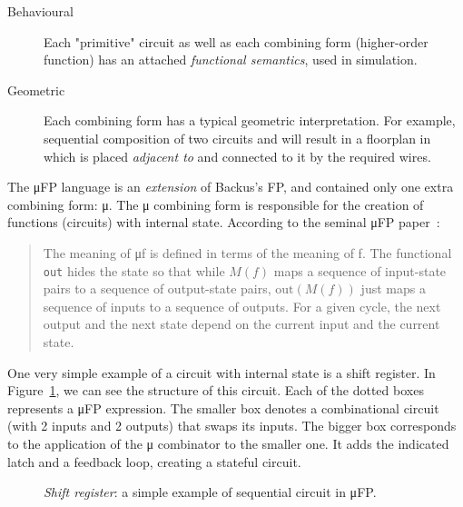         \begin{description}
            \item[Behavioural]
                Each "primitive" circuit as well as each combining form (higher-order function)
                has an attached \emph{functional semantics}, used in simulation.
            \item[Geometric]
                Each combining form has a typical geometric interpretation.
                For example, sequential composition of two circuits  and  will result
                in a floorplan in which  is placed \emph{adjacent to}  and connected to it
                by the required wires.
        \end{description}

        The μFP language is an \emph{extension} of Backus's FP, and contained only one extra combining form: μ.
        The μ combining form is responsible for the creation of functions (circuits) with internal state.
        According to the seminal μFP paper~\cite{mufp-1984}:

        \begin{quote}
            The meaning of μf is defined in terms of the meaning of f.
            The functional \texttt{out} hides the state
            so that while $M(f)$ maps a sequence of input-state pairs to a sequence of output-state pairs,
            $\text{out}(M(f))$ just maps a sequence of inputs to a sequence of outputs.
            For a given cycle, the next output and the next state depend on the current input and the current state.
        \end{quote}

        One very simple example of a circuit with internal state is a shift register.
        In Figure~\ref{fig:mufp-shift}, we can see the structure of this circuit.
        Each of the dotted boxes represents a μFP expression.
        The smaller box denotes a combinational circuit (with 2 inputs and 2 outputs) that swaps its inputs.
        The bigger box corresponds to the application of the μ combinator to the smaller one.
        It adds the indicated latch and a feedback loop, creating a stateful circuit.

        \begin{figure}[h]
            \caption{\emph{Shift register}: a simple example of sequential circuit in μFP. \label{fig:mufp-shift}}
        \end{figure}

